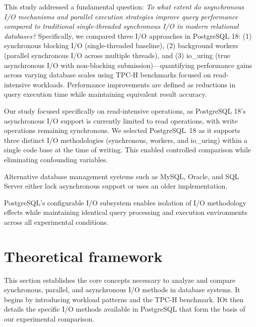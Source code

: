 \documentclass[conference]{IEEEtran}
\begin{document}
This study addressed a fundamental question: \emph{To what extent do asynchronous I/O mechanisms and parallel execution strategies improve query performance compared to traditional single-threaded synchronous I/O in modern relational databases?} Specifically, we compared three I/O approaches in PostgreSQL 18: (1) synchronous blocking I/O (single-threaded baseline), (2) background workers (parallel synchronous I/O across multiple threads), and (3) io\_uring (true asynchronous I/O with non-blocking submission)—quantifying performance gains across varying database scales using TPC-H benchmarks focused on read-intensive workloads. Performance improvements are defined as reductions in query execution time while maintaining equivalent result accuracy.

Our study focused specifically on read-intensive operations, as PostgreSQL 18's asynchronous I/O support is currently limited to read operations, with write operations remaining synchronous. We selected PostgreSQL~18 as it supports three distinct I/O methodologies (synchronous, workers, and io\_uring) within a single code base at the time of writing. This enabled controlled comparison while eliminating confounding variables.

Alternative database management systems such as MySQL, Oracle, and SQL Server either lack asynchronous support or uses an older implementation. 
PostgreSQL's configurable I/O subsystem enables isolation of I/O methodology effects while maintaining identical query processing and execution environments across all experimental conditions.


\section{Theoretical framework}
\label{sec:theoreticalframework}

This section establishes the core concepts necessary to analyze and compare synchronous, parallel, and asynchronous I/O methods in database systems. It begins by introducing workload patterns and the TPC-H benchmark. IOt then details the specific I/O methods available in PostgreSQL that form the basis of our experimental comparison.
\end{document}

